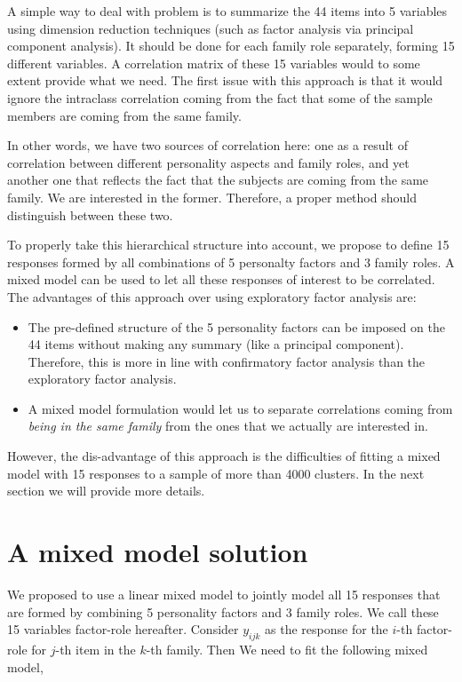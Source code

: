 \documentclass[11pt,a5paper,twoside]{book}
\begin{document}
A simple way to deal with problem is to summarize the 44 items into 5 variables using dimension reduction techniques (such as factor analysis via principal component analysis). It should be done for each family role separately, forming 15 different variables. A correlation matrix of these 15 variables would to some extent provide what we need. The first issue with this approach is that it would ignore the intraclass correlation coming from the fact that some of the sample members are coming from the same family. 

In other words, we have two sources of correlation here: one as a result of correlation between different personality aspects and family roles, and yet another one that reflects the fact that the subjects are coming from the same family. We are interested in the former. Therefore, a proper method should distinguish between these two.

To properly take this hierarchical structure into account, we propose to define 15 responses formed by all combinations of 5 personalty factors and 3 family roles. A mixed model can be used to let all these responses of interest to be correlated. The advantages of this approach over using exploratory factor analysis are:

\begin{itemize}
\item The pre-defined structure of the 5 personality factors can be imposed on the 44 items without making any summary (like a principal component). Therefore, this is more in line with confirmatory factor analysis than the exploratory factor analysis.

\item A mixed model formulation would let us to separate correlations coming from \emph{being in the same family} from the ones that we actually are interested in.
\end{itemize}

However, the dis-advantage of this approach is the difficulties of fitting a mixed model with 15 responses to a sample of more than 4000 clusters. In the next section we will provide more details.

\section{A mixed model solution}

We proposed to use a linear mixed model to jointly model all 15 responses that are formed by combining 5 personality factors and 3 family roles. We call these 15 variables factor-role hereafter. Consider $y_{ijk}$ as the response for the $i$-th factor-role for $j$-th item in the $k$-th family. Then We need to fit the following mixed model,
\end{document}

